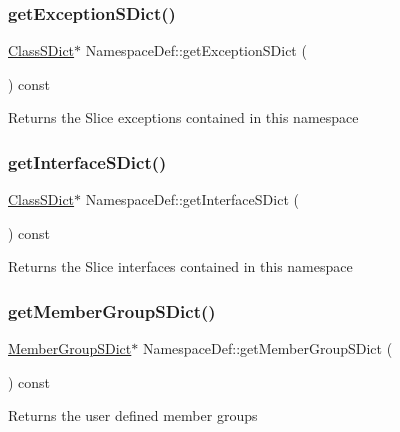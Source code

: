 \subsubsection{\texorpdfstring{getExceptionSDict()}{getExceptionSDict()}}
{\footnotesize\ttfamily \mbox{\hyperlink{class_class_s_dict}{Class\+S\+Dict}}$\ast$ Namespace\+Def\+::get\+Exception\+S\+Dict (\begin{DoxyParamCaption}{ }\end{DoxyParamCaption}) const\hspace{0.3cm}{\ttfamily [inline]}}

Returns the Slice exceptions contained in this namespace \mbox{\label{class_namespace_def_a1b3e2acf67bf2617ecb20bc0d9292276}} 
\subsubsection{\texorpdfstring{getInterfaceSDict()}{getInterfaceSDict()}}
{\footnotesize\ttfamily \mbox{\hyperlink{class_class_s_dict}{Class\+S\+Dict}}$\ast$ Namespace\+Def\+::get\+Interface\+S\+Dict (\begin{DoxyParamCaption}{ }\end{DoxyParamCaption}) const\hspace{0.3cm}{\ttfamily [inline]}}

Returns the Slice interfaces contained in this namespace \mbox{\label{class_namespace_def_a10eb5409ddfcab44c5c7e918c4fd8ea9}} 
\subsubsection{\texorpdfstring{getMemberGroupSDict()}{getMemberGroupSDict()}}
{\footnotesize\ttfamily \mbox{\hyperlink{class_member_group_s_dict}{Member\+Group\+S\+Dict}}$\ast$ Namespace\+Def\+::get\+Member\+Group\+S\+Dict (\begin{DoxyParamCaption}{ }\end{DoxyParamCaption}) const\hspace{0.3cm}{\ttfamily [inline]}}

Returns the user defined member groups \mbox{\label{class_namespace_def_a75bbeb53b77a096551ddae14fa44729d}} 
